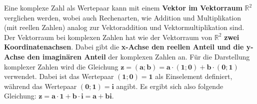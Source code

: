 \parbox{0.9\textwidth}
{
    Eine komplexe Zahl als Wertepaar kann mit einem \textbf{Vektor im Vektorraum} $\mathbb{R}^2$ verglichen werden,
    wobei auch Rechenarten, wie Addition und Multiplikation (mit reellen Zahlen) analog zur Vektoraddition und Vektormultiplikation sind.
    Der Vektorraum bei komplexen Zahlen hat wie der Vektorraum von $\mathbb{R}^2$ \textbf{zwei Koordinatenachsen}.
    Dabei gibt die \textbf{x-Achse den reellen Anteil und die y-Achse den imaginären Anteil} der komplexen Zahlen an.
    Für die Darstellung komplexer Zahlen wird die Gleichung 
    $\mathbf{z = \left(a; b\right) = a \cdot \left(1; 0\right) + b \cdot \left(0;1\right)}$ verwendet.
    Dabei ist das Wertepaar $\mathbf{\left(1; 0\right) = 1}$ als Einselement definiert, während das Wertepaar 
    $\mathbf{\left(0; 1\right) = i}$ angibt. Es ergibt sich also folgende Gleichung: 
    $\mathbf{z = a \cdot 1 + b \cdot i = a + bi}$.
}

\begin{center}
\end{center}

